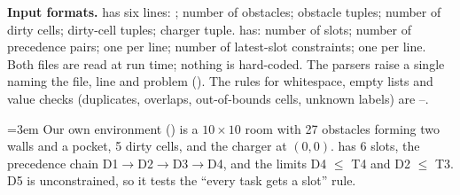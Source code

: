 \textbf{Input formats.}  has six lines: ; number of obstacles;
obstacle tuples; number of dirty cells; dirty-cell tuples; charger tuple.  has:
number of slots; number of precedence pairs; one  per line; number of latest-slot
constraints; one  per line. Both files are read at run time; nothing is hard-coded.
The parsers raise a single  naming the file, line and problem (). The rules
for whitespace, empty lists and value checks (duplicates, overlaps, out-of-bounds cells, unknown
labels) are --.

{\emergencystretch=3em Our own environment () is a $10\times10$ room with 27 obstacles forming two
walls and a pocket, 5 dirty cells, and the charger at $(0,0)$.  has 6 slots, the
precedence chain D1$\to$D2$\to$D3$\to$D4, and the limits D4 $\le$ T4 and D2 $\le$ T3. D5 is
unconstrained, so it tests the ``every task gets a slot'' rule.\par}
